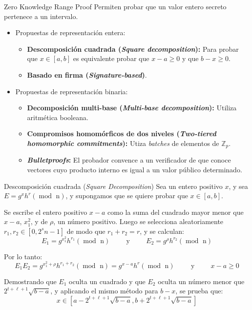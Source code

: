\documentclass[8pt,xcolor=dvipsnames]{beamer}
\begin{document}
\begin{frame}[fragile]{Zero Knowledge Range Proof}
    Permiten probar que un valor entero secreto pertenece a un intervalo.

    \begin{itemize}
        \item Propuestas de representación entera:
        \begin{itemize}
            \item \textbf{Descomposición cuadrada (\textit{Square decomposition}):} Para probar que $x \in [a, b]$ es equivalente probar que $x - a \geq 0$ y que $b - x \geq 0$.
            \item \textbf{Basado en firma (\textit{Signature-based})}.
        \end{itemize}
        \item Propuestas de representación binaria:
        \begin{itemize}
            \item \textbf{Decomposición multi-base (\textit{Multi-base decomposition}):} Utiliza aritmética booleana.
            \item \textbf{Compromisos homomórficos de dos niveles (\textit{Two-tiered homomorphic commitments}):} Utiza \textit{batches} de elementos de $\mathbb{Z}_{p}$.
            \item \textbf{\textit{Bulletproofs}:} El probador convence a un verificador de que conoce vectores cuyo producto interno es igual a un valor público determinado.
        \end{itemize}
    \end{itemize}

\end{frame}


\begin{frame}[fragile]{Descomposición cuadrada (\textit{Square Decomposition})}
    Sea un entero positivo $x$, y sea $E = g^{x}h^{r} (\operatorname{mod} \text{ n})$, y supongamos que se quiere probar que $x \in [a, b]$.

    Se escribe el entero positivo $x - a$ como la suma del cuadrado mayor menor que $x-a$, $x_{1}^{2}$, y de $\rho$, un número positivo. Luego se selecciona aleatoriamente $r_{1}, r_{2} \in [0, 2^{s}n-1]$ de modo que $r_{1} + r_{2} = r$, y se calculan:
    $$E_{1} = g^{x_{1}^{2}}h^{r_{1}} (\operatorname{mod} \text{ n}) \hspace{1cm} \text{y} \hspace{1cm} E_{2} = g^{\rho}h^{r_{2}} (\operatorname{mod} \text{ n})$$

    Por lo tanto:
    $$E_{1}E_{2} = g^{x_{1}^{2}+\rho}h^{r_{1}+r_{2}} (\operatorname{mod} \text{ n}) = g^{x-a}h^{r} (\operatorname{mod} \text{ n}) \hspace{1cm} \text{y} \hspace{1cm} x - a \geq 0$$

    Demostrando que $E_{1}$ oculta un cuadrado y que $E_{2}$ oculta un número menor que $2^{t+\ell+1}\sqrt{b-a}$, y aplicando el mismo método para $b - x$, se prueba que:
    $$x \in [a - 2^{t+\ell+1} \sqrt{b-a}, b + 2^{t+\ell+1} \sqrt{b-a}]$$
\end{frame}
\end{document}
